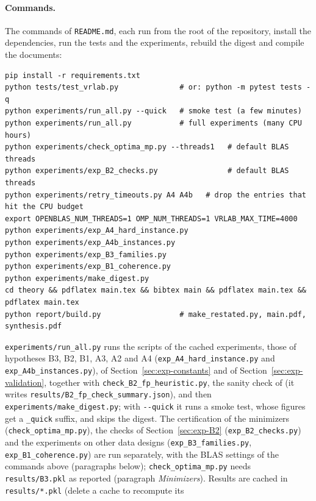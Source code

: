 \paragraph{Commands.} The commands of \nolinkurl{README.md}, each run from the root of the repository, install the
dependencies, run the tests and the experiments, rebuild the digest and compile the documents:
\begin{small}
\begin{verbatim}
pip install -r requirements.txt
python tests/test_vrlab.py              # or: python -m pytest tests -q
python experiments/run_all.py --quick   # smoke test (a few minutes)
python experiments/run_all.py           # full experiments (many CPU hours)
python experiments/check_optima_mp.py --threads1   # default BLAS threads
python experiments/exp_B2_checks.py                # default BLAS threads
python experiments/retry_timeouts.py A4 A4b   # drop the entries that hit the CPU budget
export OPENBLAS_NUM_THREADS=1 OMP_NUM_THREADS=1 VRLAB_MAX_TIME=4000
python experiments/exp_A4_hard_instance.py
python experiments/exp_A4b_instances.py
python experiments/exp_B3_families.py
python experiments/exp_B1_coherence.py
python experiments/make_digest.py
cd theory && pdflatex main.tex && bibtex main && pdflatex main.tex && pdflatex main.tex
python report/build.py                  # make_restated.py, main.pdf, synthesis.pdf
\end{verbatim}
\end{small}
\nolinkurl{experiments/run_all.py} runs the scripts of the cached experiments, those of hypotheses B3, B2, B1, A3, A2 and
A4 (\nolinkurl{exp_A4_hard_instance.py} and \nolinkurl{exp_A4b_instances.py}), of Section~\ref{sec:exp-constants} and of
Section~\ref{sec:exp-validation}, together with \nolinkurl{check_B2_fp_heuristic.py}, the sanity check of
 (it writes \nolinkurl{results/B2_fp_check_summary.json}), and then
\nolinkurl{experiments/make_digest.py}; with \texttt{-{}-quick} it runs a smoke test, whose figures get a
\nolinkurl{_quick} suffix, and skips the digest. The certification of the minimizers (\nolinkurl{check_optima_mp.py}),
the checks of Section~\ref{sec:exp-B2} (\nolinkurl{exp_B2_checks.py}) and the experiments on other data designs
(\nolinkurl{exp_B3_families.py}, \nolinkurl{exp_B1_coherence.py}) are run separately, with the BLAS settings of the
commands above (paragraphs below); \nolinkurl{check_optima_mp.py} needs \nolinkurl{results/B3.pkl} as reported
(paragraph \emph{Minimizers}). Results are cached in \nolinkurl{results/*.pkl} (delete a cache to recompute its
